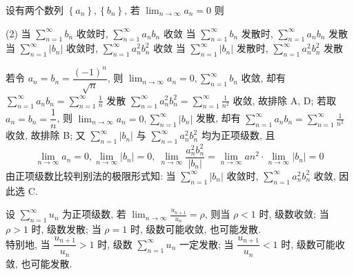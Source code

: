 \begin{example}[2009 数一]
    设有两个数列 $ \left\{a_{n}\right\},\left\{b_{n}\right\}$, 若 $\displaystyle \lim _{n \to \infty} a_{n}=0 $ 则
    \begin{tasks}(2)
        \task 当 $\displaystyle \sum_{n=1}^{\infty} b_{n} $ 收敛时, $\displaystyle \sum_{n=1}^{\infty} a_{n} b_{n} $ 收敛
        \task 当 $\displaystyle \sum_{n=1}^{\infty} b_{n} $ 发散时, $\displaystyle \sum_{n=1}^{\infty} a_{n} b_{n} $ 发散
        \task 当 $\displaystyle \sum_{n=1}^{\infty}\left|b_{n}\right| $ 收敛时, $\displaystyle \sum_{n=1}^{\infty} a_{n}^{2} b_{n}^{2} $ 收敛
        \task 当 $\displaystyle \sum_{n=1}^{\infty}\left|b_{n}\right| $ 发散时, $\displaystyle \sum_{n=1}^{\infty} a_{n}^{2} b_{n}^{2} $ 发散
    \end{tasks}
\end{example}
\begin{solution}
    若令 $ a_{n}=b_{n}=\dfrac{(-1)^{n}}{\sqrt{n}}$, 则 $\displaystyle \lim _{n \rightarrow \infty} a_{n}=0, \sum_{n=1}^{\infty} b_{n} $ 收敛,
    却有 $\displaystyle  \sum_{n=1}^{\infty} a_{n} b_{n}=\sum_{n=1}^{\infty} \frac{1}{n} $ 发散 $\displaystyle \sum_{n=1}^{\infty} a_{n}^{2} b_{n}^{2}=\sum_{n=1}^{\infty} \frac{1}{n^{2}} $ 收敛,
    故排除 A, D;
    若取 $ a_{n}=b_{n}=\dfrac{1}{n} $, 则 $\displaystyle  \lim _{n \rightarrow \infty} a_{n}=0, \sum_{n=1}^{\infty}\left|b_{n}\right| $ 发散,
    却有 $\displaystyle \sum_{n=1}^{\infty} a_{n} b_{n}=\sum_{n=1}^{\infty} \frac{1}{n^{2}} $ 收敛, 故排除 B;
    又 $\displaystyle \sum_{n=1}^{\infty}\left|b_{n}\right| $ 与 $\displaystyle \sum_{n=1}^{\infty} a_{n}^{2} b_{n}^{2} $ 均为正项级数, 且
    $$\displaystyle\lim _{n \rightarrow \infty} a_{n}=0, \lim _{n \rightarrow \infty}\left|b_{n}\right|=0 ,~\lim_{n\to\infty}\dfrac{a_n^2b_n^2}{|b_n|}=\lim_{n\to\infty}an^2\cdot\lim_{n\to\infty}|b_n|=0$$
    由正项级数比较判别法的极限形式知: 当 $\displaystyle\sum_{n=1}^{\infty}|b_n|$ 收敛时, $\displaystyle\sum_{n=1}^{\infty}a_n^2b_n^2$ 收敛, 因此选 C.
\end{solution}

\begin{theorem}[比值审敛法]
    设 $\displaystyle  \sum_{n=1}^{\infty} u_{n} $ 为正项级数, 若 $\displaystyle  \lim _{n \rightarrow \infty} \frac{u_{n+1}}{u_{n}}=\rho $, 则当 $ \rho<1 $ 时, 级数收敛;
    当 $ \rho>1 $ 时, 级数发散; 当 $ \rho=1 $ 时, 级数可能收敛, 也可能发散.\\
    特别地, 当 $ \dfrac{u_{n+1}}{u_{n}}>1 $ 时, 级数 $\displaystyle  \sum_{n=1}^{\infty} u_{n} $ 一定发散; 当 $ \dfrac{u_{n+1}}{u_{n}}<1 $ 时, 级数可能收敛, 也可能发散.
\end{theorem}

